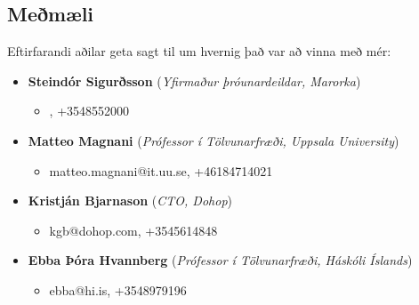 \documentclass[10pt]{article}
\begin{document}
\begin{flushleft}
\section*{Meðmæli}
Eftirfarandi aðilar geta sagt til um hvernig það var að vinna með mér: \newline

\begin{itemize}
  \item \textbf{Steindór Sigurðsson} (\textit{Yfirmaður þróunardeildar, Marorka})
  \begin{itemize}
  \item <óþekktur tölvupóstur>, +3548552000 
  \end{itemize}
  \item \textbf{Matteo Magnani} (\textit{Prófessor í Tölvunarfræði, Uppsala University})
  \begin{itemize}
  \item matteo.magnani@it.uu.se, +46184714021
  \end{itemize}
  \item \textbf{Kristján Bjarnason} (\textit{CTO, Dohop})
  \begin{itemize}
  \item kgb@dohop.com, +3545614848
  \end{itemize}
  \item \textbf{Ebba Þóra Hvannberg} (\textit{Prófessor í Tölvunarfræði, Háskóli Íslands})
  \begin{itemize}
  \item ebba@hi.is, +3548979196
  \end{itemize}
\end{itemize}


\end{flushleft}
\end{document}

